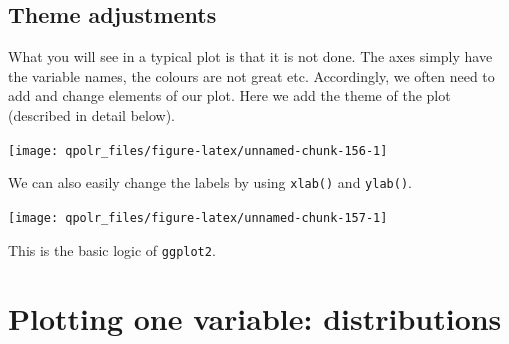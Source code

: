 \documentclass[12pt,oneside]{reedthesis}
\theoremstyle{definition}
\theoremstyle{definition}
\theoremstyle{definition}
\theoremstyle{remark}
\begin{document}
  \subsection{Theme adjustments}\label{theme-adjustments}
  
  What you will see in a typical plot is that it is not done. The axes
  simply have the variable names, the colours are not great etc.
  Accordingly, we often need to add and change elements of our plot. Here
  we add the theme of the plot (described in detail below).
  \begin{Shaded}
  \begin{Highlighting}[]
  \NormalTok{(}\OperatorTok{+}
  \StringTok{  }\NormalTok{() }\OperatorTok{+}
  \StringTok{  }\NormalTok{()}
  \end{Highlighting}
  \end{Shaded}
  \begin{center}\texttt{[image: qpolr\_files/figure-latex/unnamed-chunk-156-1]} \end{center}
  
  We can also easily change the labels by using \texttt{xlab()} and
  \texttt{ylab()}.
  \begin{Shaded}
  \begin{Highlighting}[]
  \NormalTok{(}\OperatorTok{+}
  \StringTok{  }\NormalTok{() }\OperatorTok{+}
  \StringTok{  }\NormalTok{() }\OperatorTok{+}
  \StringTok{  }\NormalTok{(}\NormalTok{) }\OperatorTok{+}
  \StringTok{  }\NormalTok{(}\NormalTok{)}
  \end{Highlighting}
  \end{Shaded}
  \begin{center}\texttt{[image: qpolr\_files/figure-latex/unnamed-chunk-157-1]} \end{center}
  
  This is the basic logic of \texttt{ggplot2}.
  
  \section{Plotting one variable:
  distributions}\label{plotting-one-variable-distributions}
  
\end{document}
